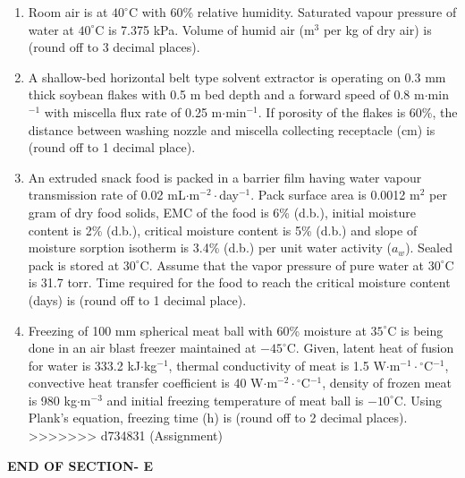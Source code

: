 \documentclass[journal,12pt,onecolumn]{IEEEtran}
\begin{document}
\begin{enumerate}
\vspace{0.5cm}

\item Room air is at $40^\circ$C with 60\% relative humidity. Saturated vapour pressure of water at $40^\circ$C is 7.375 kPa. Volume of humid air (m$^{3}$ per kg of dry air) is \underline{\hspace{2cm}} (round off to 3 decimal places).
\vspace{0.05cm}
\hfill{} \\

\newpage

\item A shallow-bed horizontal belt type solvent extractor is operating on 0.3 mm thick soybean flakes with 0.5 m bed depth and a forward speed of 0.8 m$\cdot$min$^{-1}$ with miscella flux rate of 0.25 m$\cdot$min$^{-1}$. If porosity of the flakes is 60\%, the distance between washing nozzle and miscella collecting receptacle (cm) is \underline{\hspace{2cm}} (round off to 1 decimal place).
\hfill{} \\

\vspace{0.5cm}

\item An extruded snack food is packed in a barrier film having water vapour transmission rate of 0.02 mL$\cdot$m$^{-2}\cdot$day$^{-1}$. Pack surface area is 0.0012 m$^{2}$ per gram of dry food solids, EMC of the food is 6\% (d.b.), initial moisture content is 2\% (d.b.), critical moisture content is 5\% (d.b.) and slope of moisture sorption isotherm is 3.4\% (d.b.) per unit water activity ($a_w$). Sealed pack is stored at $30^\circ$C. Assume that the vapor pressure of pure water at $30^\circ$C is 31.7 torr. Time required for the food to reach the critical moisture content (days) is \underline{\hspace{2cm}} (round off to 1 decimal place).
\hfill{} \\

\vspace{0.5cm}

\item Freezing of 100 mm spherical meat ball with 60\% moisture at $35^\circ$C is being done in an air blast freezer maintained at $-45^\circ$C. Given, latent heat of fusion for water is 333.2 kJ$\cdot$kg$^{-1}$, thermal conductivity of meat is 1.5 W$\cdot$m$^{-1}\cdot{}^\circ$C$^{-1}$, convective heat transfer coefficient is 40 W$\cdot$m$^{-2}\cdot{}^\circ$C$^{-1}$, density of frozen meat is 980 kg$\cdot$m$^{-3}$ and initial freezing temperature of meat ball is $-10^\circ$C. Using Plank's equation, freezing time (h) is \underline{\hspace{2cm}} (round off to 2 decimal places).
\hfill{} \\

\vspace{0.5cm}
>>>>>>> d734831 (Assignment)

\end{enumerate}

\vspace{3\baselineskip}
\begin{center}
    \item[\textbf{END OF SECTION- E}]
\end{center}
\end{document}
